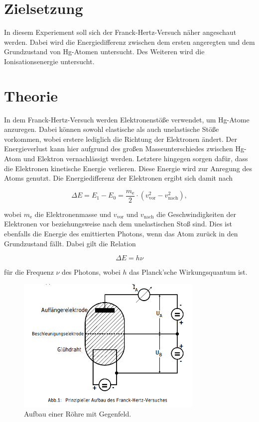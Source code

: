 \section{Zielsetzung}

In diesem Experiement soll sich der Franck-Hertz-Versuch näher angeschaut werden. Dabei wird die Energiedifferenz zwischen dem ersten angeregten und dem Grundzustand von Hg-Atomen untersucht.
Des Weiteren wird die Ionisationsenergie untersucht.

\section{Theorie}
\label{sec:Theorie}

In dem Franck-Hertz-Versuch werden Elektronenstöße verwendet, um Hg-Atome anzuregen.
Dabei können sowohl elastische als auch unelastische Stöße vorkommen, wobei erstere lediglich die Richtung der Elektronen ändert. 
Der Energieverlust kann hier aufgrund des großen Masseunterschiedes zwischen Hg-Atom und Elektron vernachlässigt werden.
Letztere hingegen sorgen dafür, dass die Elektronen kinetische Energie verlieren. Diese Energie wird zur Anregung des Atoms genutzt.
Die Energiedifferenz der Elektronen ergibt sich damit nach

\begin{equation}
    \label{eqn:e-diff}
    \Delta E = E_1 - E_0 = \frac{m_\text{e}}{2} \cdot (v_\text{vor}^2 - v_\text{nach}^2),
\end{equation}

wobei $m_\text{e}$ die Elektronenmasse und $v_\text{vor}$ und $v_\text{nach}$ die Geschwindigkeiten der Elektronen vor beziehungsweise nach dem unelastischen Stoß sind.
Dies ist ebenfalls die Energie des emittierten Photons, wenn das Atom zurück in den Grundzustand fällt. Dabei gilt die Relation

\begin{equation}
    \label{eqn:photon-energie}
    \Delta E = h \nu
\end{equation}

für die Frequenz $\nu$ des Photons, wobei $h$ das Planck'sche Wirkungsquantum ist.

\begin{figure}
    \centering
    \includegraphics[width=0.8\textwidth]{content/fh-roehre.png}
    \caption{Aufbau einer Röhre mit Gegenfeld\cite{V601}.}
    \label{fig:ion}
\end{figure}

